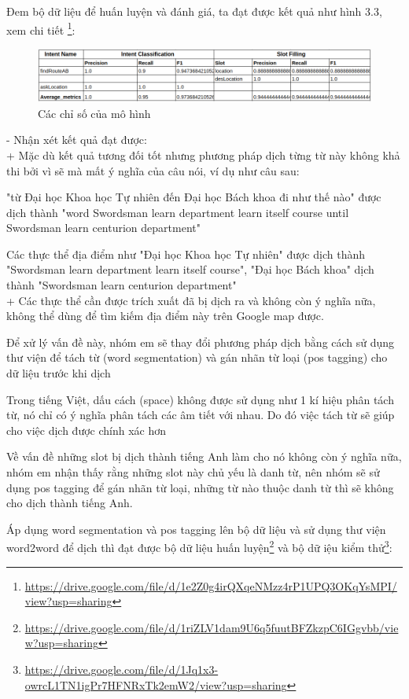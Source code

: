 	Đem bộ dữ liệu để huấn luyện và đánh giá, ta đạt được kết quả như hình 3.3, xem chi tiết \footnote{\url{https://drive.google.com/file/d/1e2Z0g4irQXqeNMzz4rP1UPQ3OKqYsMPI/view?usp=sharing}}: 


   \begin{figure}[htp]
              \centering
              \includegraphics[width=15cm]{images/metrics-dich-tung-t.png} 
              \caption{Các chỉ số của mô hình}
              \label{fig:sodohethongchiduong}

          \end{figure} 
          
	- Nhận xét kết quả đạt được:
	\\
	+ Mặc dù kết quả tương đối tốt nhưng phương pháp dịch từng từ này không khả thi bởi vì sẽ mà mất ý nghĩa của câu nói, ví dụ như câu sau: 

"từ Đại học Khoa học Tự nhiên đến Đại học Bách khoa đi như thế nào" được dịch thành "word Swordsman learn department learn itself course until Swordsman learn centurion department"

Các thực thể địa điểm như "Đại học Khoa học Tự nhiên" được dịch thành "Swordsman learn department learn itself course", "Đại học Bách khoa" dịch thành "Swordsman learn centurion department"
\\
	+ Các thực thể cần được trích xuất đã bị dịch ra và không còn ý nghĩa nữa, không thể dùng để tìm kiếm địa điểm này trên Google map được.

	Để xử lý vấn đề này, nhóm em sẽ thay đổi phương pháp dịch bằng cách sử dụng thư viện để tách từ (word segmentation) và gán nhãn từ loại (pos tagging) cho dữ liệu trước khi dịch

Trong tiếng Việt, dấu cách (space) không được sử dụng như 1 kí hiệu phân tách từ, nó chỉ có ý nghĩa phân tách các âm tiết với nhau. Do đó việc tách từ sẽ giúp cho việc dịch được chính xác hơn

Về vấn đề những slot bị dịch thành tiếng Anh làm cho nó không còn ý nghĩa nữa, nhóm em nhận thấy rằng những slot này chủ yếu là danh từ, nên nhóm sẽ sử dụng pos tagging để gán nhãn từ loại, những từ nào thuộc danh từ thì sẽ không cho dịch thành tiếng Anh.

Áp dụng word segmentation và pos tagging lên bộ dữ liệu và sử dụng thư viện word2word để dịch thì đạt được bộ dữ liệu huấn luyện\footnote{\url{https://drive.google.com/file/d/1riZLV1dam9U6q5fuutBFZkzpC6IGgvbb/view?usp=sharing}} và bộ dữ iệu kiểm thử\footnote{	\url{https://drive.google.com/file/d/1Jq1x3-owrcL1TN1igPr7HFNRxTk2emW2/view?usp=sharing}
}:


